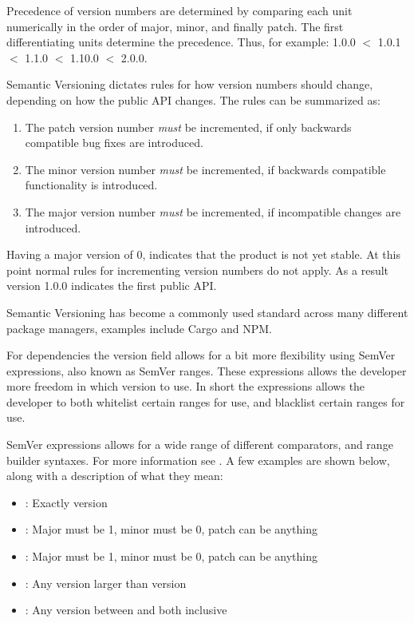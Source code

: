 Precedence of version numbers are determined by comparing each unit numerically
in the order of major, minor, and finally patch. The first differentiating
units determine the precedence. Thus, for example: 1.0.0 $<$ 1.0.1 $<$ 1.1.0
$<$ 1.10.0 $<$ 2.0.0.

Semantic Versioning dictates rules for how version numbers should change,
depending on how the public API changes. The rules can be summarized as:

\begin{enumerate}

    \item The patch version number \emph{must} be incremented, if only
        backwards compatible bug fixes are introduced.

    \item The minor version number \emph{must} be incremented, if backwards
        compatible functionality is introduced.

    \item The major version number \emph{must} be incremented, if incompatible
        changes are introduced.

\end{enumerate}

Having a major version of 0, indicates that the product is not yet stable. At
this point normal rules for incrementing version numbers do not apply. As a
result version 1.0.0 indicates the first public API.

Semantic Versioning has become a commonly used standard across many different
package managers, examples include
Cargo\autocite{CRAA} and NPM\autocite{NPMA}.


For dependencies the version field allows for a bit more flexibility using
SemVer expressions, also known as SemVer ranges\autocite{NPMB}. These
expressions allows the developer more freedom in which version to use. In short
the expressions allows the developer to both whitelist certain ranges for use,
    and blacklist certain ranges for use.

SemVer expressions allows for a wide range of different comparators, and range
builder syntaxes. For more information see \autocite{NPMB}. A few examples are
shown below, along with a description of what they mean:

\begin{itemize}
    \item {}: Exactly version 
    \item {}: Major must be 1, minor must be 0, patch can be anything
    \item {}: Major must be 1, minor must be 0, patch can be anything
    \item {}: Any version larger than version 
    \item {}: Any version between  and
     both inclusive
\end{itemize}

